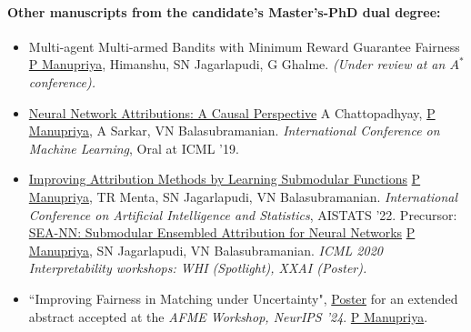 \paragraph{Other manuscripts from the candidate's Master's-PhD dual degree:}
\vspace{-0.2in}
\begin{itemize}
\itemsep-0.5em
    \item Multi-agent Multi-armed Bandits with Minimum Reward Guarantee Fairness
    \newline\underline{P Manupriya}, Himanshu, SN Jagarlapudi, G Ghalme. 
    \newline \textit{(Under review at an $A^*$ conference).}
    \newline  \href{https://github.com/Piyushi-0/Fair-MAMAB}{\color{darkgray!90}{Code - https://github.com/Piyushi-0/Fair-MAMAB}} 
    \item  \href{https://arxiv.org/pdf/1902.02302}{Neural Network Attributions: A Causal Perspective}\newline
    A Chattopadhyay, \underline{P Manupriya}, A Sarkar, VN Balasubramanian.\newline
     \textit{International Conference on Machine Learning}, Oral at ICML '19.
    \newline \href{https://github.com/Piyushi-0/ACE}{\color{darkgray!90}{Code - https://github.com/Piyushi-0/ACE}}
    \item \href{https://proceedings.mlr.press/v151/manupriya22a.html}{Improving Attribution Methods by Learning Submodular Functions} \newline\underline{P Manupriya}, TR Menta, SN Jagarlapudi, VN Balasubramanian. \newline \textit{International Conference on Artificial Intelligence and Statistics}, AISTATS '22.
    \newline
     \href{https://github.com/Piyushi-0/SEA-NN}{\color{darkgray!90}{Code - https://github.com/Piyushi-0/SEA-NN}}\newline
     Precursor: \href{http://interpretable-ml.org/icml2020workshop/pdf/29.pdf}{SEA-NN: Submodular Ensembled Attribution for Neural Networks}
    \newline
     \underline{P Manupriya}, SN Jagarlapudi, VN Balasubramanian.
    \newline  \textit{ICML 2020 Interpretability workshops: WHI (Spotlight), XXAI (Poster).}
    \item ``Improving Fairness in Matching under Uncertainty", \href{https://neurips.cc/virtual/2024/101544}{Poster} for an extended abstract accepted at the \textit{AFME Workshop, NeurIPS '24}. 
    \newline
    \underline{P Manupriya}.
\end{itemize}